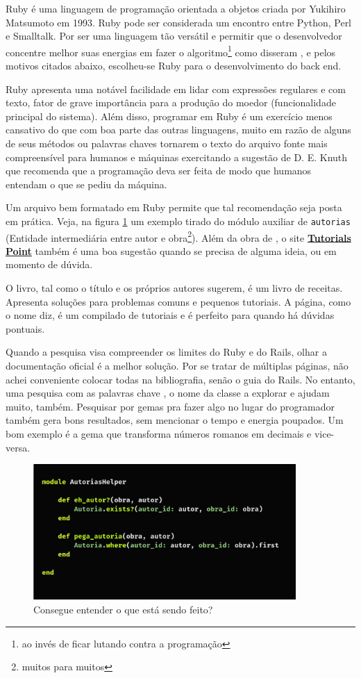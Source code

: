 Ruby é uma linguagem de programação orientada a objetos criada por Yukihiro
Matsumoto em 1993. Ruby pode ser considerada um encontro entre Python,
Perl e Smalltalk. Por ser uma linguagem tão versátil e permitir que o
desenvolvedor concentre melhor suas energias em fazer o algoritmo\footnote{ao
invés de ficar lutando contra a programação}  como disseram \citet{Rcook:09}, e
pelos motivos citados abaixo, escolheu-se Ruby para o desenvolvimento do back end.

Ruby apresenta uma notável facilidade em lidar com expressões regulares
e com texto, fator de grave importância para a produção do moedor (funcionalidade
principal do sistema). Além disso, programar em Ruby é um exercício menos cansativo
do que com boa parte das outras linguagens, muito em razão de alguns de seus métodos
ou palavras chaves tornarem o texto do arquivo fonte mais compreensível para
humanos e máquinas exercitando a sugestão de D. E. Knuth que recomenda que a
programação deva ser feita de modo que humanos entendam o que se pediu da máquina.

Um arquivo bem formatado em Ruby permite que tal recomendação seja posta em
prática. Veja, na figura \ref{fig:ruby} um exemplo tirado do módulo auxiliar de
\texttt{autorias} (Entidade intermediária entre autor e obra\footnote{muitos para
muitos}). Além da obra de \citet{Rcook:09}, o site
\href{https://www.tutorialspoint.com/ruby/index.htm}{\textbf{Tutorials Point}}
também é uma boa sugestão quando se precisa de alguma ideia, ou em momento de dúvida.

O livro, tal como o título e os próprios autores \citet[xvii]{Rcook:09} sugerem, é um
livro de receitas. Apresenta soluções para problemas comuns e pequenos tutoriais. A
página, como o nome diz, é um compilado de tutoriais e é perfeito para quando há
dúvidas pontuais.

Quando a pesquisa visa compreender os limites do Ruby e do Rails, olhar a documentação
oficial é a melhor solução. Por se tratar de múltiplas páginas, não achei conveniente
colocar todas na bibliografia, senão o guia do Rails. No entanto, uma pesquisa com as
palavras chave , o nome da classe a explorar e  ajudam muito, também.
Pesquisar por gemas pra fazer algo no lugar do programador também gera bons resultados, sem
mencionar o tempo e energia poupados. Um bom exemplo é a gema que transforma números romanos
em decimais e vice-versa.

\begin{figure}
    \centering
    \includegraphics[width=10cm]{figuras/ruby}
    \caption{Consegue entender o que está sendo feito?}
    \label{fig:ruby}
\end{figure}

